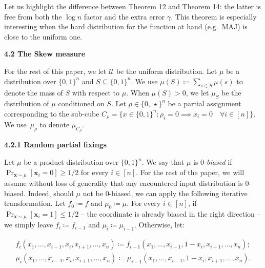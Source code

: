 \documentclass[10pt,a4paper]{article}
\begin{document}



Let us highlight the difference between Theorem 12 and Theorem 14: the latter is free from both the $\log n$ factor and the extra error $\gamma$. This theorem is especially interesting when the hard distribution for the function at hand (e.g. MAJ) is close to the uniform one.\par





\par\medskip\noindent\textbf{
4.2 The Skew measure}\par




For the rest of this paper, we let $\mathcal{U}$ be the uniform distribution. Let $\mu$ be a distribution over $\{0,1\}^{n}$ and $S\subseteq\{0,1\}^{n}$. We use $\mu(S)\coloneqq\sum_{s\in S}\mu(s)$ to denote the mass of $S$ with respect to $\mu$. When $\mu(S)>0$, we let $\mu_{S}$ be the distribution of $\mu$ conditioned on $S$. Let $\rho\in\{0,\,\star\}^{n}$ be a partial assignment corresponding to the sub-cube $C_{\rho}=\{x\in\{0,1\}^{n}:\rho_{i}=0\implies x_{i}=0\quad\forall i\in[n]\}$. We use $\mu_{\rho}$ to denote $\mu_{C_{\rho}}$.\par




\par\medskip\noindent\textbf{
4.2.1 Random partial fixings}\par




Let $\mu$ be a product distribution over $\{0,1\}^{n}$. We say that $\mu$ is \emph{$0$-biased} if $\Pr_{\bm{x}\sim\mu}[\bm{x}_{i}=0]\geq 1/2$ for every $i\in[n]$. For the rest of the paper, we will assume without loss of generality that any encountered input distribution is $0$-biased. Indeed, should $\mu$ not be $0$-biased, we can apply the following iterative transformation. Let $f_{0}\coloneqq f$ and $\mu_{0}\coloneqq\mu$. For every $i\in[n]$, if $\Pr_{\bm{x}\sim\mu}[\bm{x}_{i}=1]\leq 1/2$ – the coordinate is already biased in the right direction – we simply leave $f_{i}\coloneqq f_{i-1}$ and $\mu_{i}\coloneqq\mu_{i-1}$. Otherwise, let:\par


\[\begin{gathered}
\displaystyle f_{i}(x_{1},\ldots,x_{i-1},x_{i},x_{i+1},\ldots,x_{n})\coloneqq f_{i-1}(x_{1},\ldots,x_{i-1},1-x_{i},x_{i+1},\ldots,x_{n}); \\
\displaystyle\mu_{i}(x_{1},\ldots,x_{i-1},x_{i},x_{i+1},\ldots,x_{n})\coloneqq\mu_{i-1}(x_{1},\ldots,x_{i-1},1-x_{i},x_{i+1},\ldots,x_{n}).
\end{gathered}\]
\end{document}
